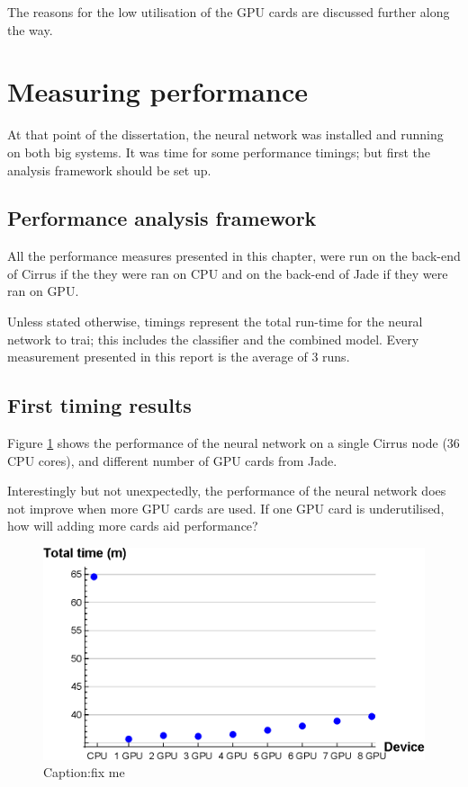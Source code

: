 The reasons for the low utilisation of the GPU cards are discussed further along the way.

\section{Measuring performance}
At that point of the dissertation, the neural network was installed and running on both big systems. It was time for some performance timings; but first the analysis framework should be set up.

\subsection{Performance analysis framework}
All the performance measures presented in this chapter, were run on the back-end of Cirrus if the they were ran on CPU and on the back-end of Jade if they were ran on GPU. 

Unless stated otherwise, timings represent the total run-time for the neural network to trai; this includes the classifier and the combined model. Every measurement presented in this report is the average of 3 runs. 

\subsection{First timing results}
Figure \ref{fig:nn_timings} shows the performance of the neural network on a single Cirrus node (36 CPU cores), and different number of GPU cards from Jade.

Interestingly but not unexpectedly, the performance of the neural network does not improve when more GPU cards are used. If one GPU card is underutilised, how will adding more cards aid performance?


\begin{figure}[H]
    \centering
    \includegraphics[width=\linewidth]{images/nnperf.eps}
    \caption{Caption:fix me}
    \label{fig:nn_timings}
\end{figure}
 
